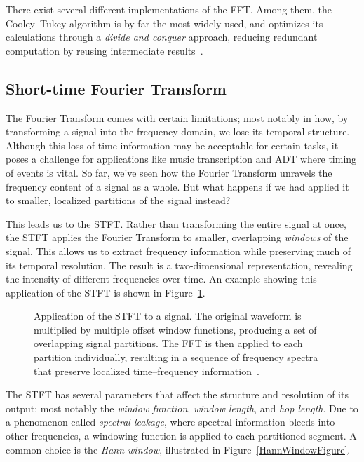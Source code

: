 There exist several different implementations of the \gls{FFT}. Among them, the Cooley–Tukey algorithm is by far the most widely used, and optimizes its calculations through a \textit{divide and conquer} approach, reducing redundant computation by reusing intermediate results~\cite{d3ea2d52-5ab2-3128-8b80-efb85267295d}.

\subsection{Short-time Fourier Transform}

The Fourier Transform comes with certain limitations; most notably in how, by transforming a signal into the frequency domain, we lose its temporal structure. Although this loss of time information may be acceptable for certain tasks, it poses a challenge for applications like music transcription and \gls{ADT} where timing of events is vital. So far, we've seen how the Fourier Transform unravels the frequency content of a signal as a whole. But what happens if we had applied it to smaller, localized partitions of the signal instead?

This leads us to the \gls{STFT}. Rather than transforming the entire signal at once, the \gls{STFT} applies the Fourier Transform to smaller, overlapping \textit{windows} of the signal. This allows us to extract frequency information while preserving much of its temporal resolution. The result is a two-dimensional representation, revealing the intensity of different frequencies over time. An example showing this application of the \gls{STFT} is shown in Figure~\ref{STFTFigure}.

\begin{figure}[H]
    \centering
    
    \caption{Application of the \gls{STFT} to a signal. The original waveform is multiplied by multiple offset window functions, producing a set of overlapping signal partitions. The \gls{FFT} is then applied to each partition individually, resulting in a sequence of frequency spectra that preserve localized time–frequency information~\cite{jeon2020area}.}
    \label{STFTFigure}
\end{figure}

The \gls{STFT} has several parameters that affect the structure and resolution of its output; most notably the \textit{window function}, \textit{window length}, and \textit{hop length}. Due to a phenomenon called \textit{spectral leakage}, where spectral information bleeds into other frequencies, a windowing function is applied to each partitioned segment. A common choice is the \textit{Hann window}, illustrated in Figure~\ref{HannWindowFigure}.


